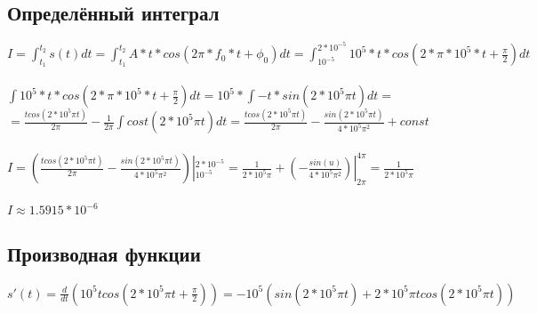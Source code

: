 \documentclass[12pt]{article}
\begin{document}
 
  \subsection*{Определённый интеграл}
 $I = \int_{t_1}^{t_2} s(t)dt = \int_{t_1}^{t_2} A*t*cos(2\pi*f_0*t + \phi_0)dt = \int_{10^{-5}}^{2*10^{-5}} 10^5 * t * cos(2 * \pi * 10^5 * t + \frac{\pi}{2}) dt$\\
 \\
 $\int 10^5 * t * cos(2 * \pi * 10^5 * t + \frac{\pi}{2}) dt = 10^5 * \int -t*sin(2*10^5\pi t)dt = $ \\
 $ = \frac{tcos(2*10^5\pi t)}{2\pi} - \frac{1}{2\pi}\int cost(2*10^5\pi t)dt = \frac{tcos(2*10^5\pi t)}{2\pi} - \frac{sin(2*10^5\pi t)}{4*10^5\pi^2} + const$\\
 \\
 $I = (\frac{tcos(2*10^5\pi t)}{2\pi} - \frac{sin(2*10^5\pi t)}{4*10^5\pi^2} )|_{10^{-5}}^{2*10^{-5}} = \frac{1}{2*10^5\pi} + (-\frac{sin(u)}{4*10^5\pi^2})|_{2\pi}^{4\pi} = \frac{1}{2*10^5\pi}$\\
 \\
 $I \approx 1.5915 * 10^{-6}$ 
 
  \subsection*{Производная функции}
 $s'(t) = \frac{d}{dt}(10^5tcos(2*10^5\pi t + \frac{\pi}{2})) = -10^5(sin(2*10^5\pi t) + 2*10^5\pi t cos(2*10^5\pi t))$
 
\end{document}
